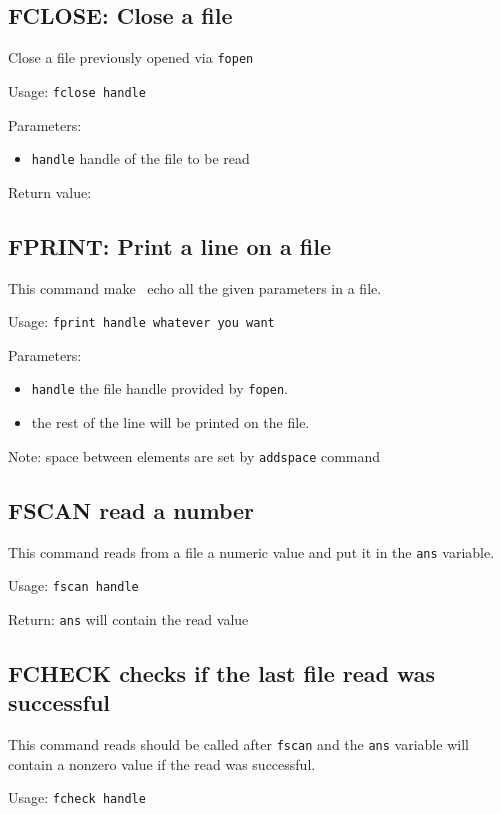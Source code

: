 \subsection{FCLOSE: Close a file}
    Close a file previously opened via \lstinline!fopen!

    Usage: \lstinline!fclose handle!

    Parameters:
    \begin{itemize}
    \item\lstinline!handle! handle of the file to be read
    \end{itemize}
    
    Return value: 
    
\subsection{FPRINT: Print a line on a file}
    This command make \afmm\ echo all the given parameters in a file.
    
    Usage: \lstinline!fprint handle whatever you want!
    
    Parameters:
    \begin{itemize}
    \item\lstinline!handle! the file handle provided by \lstinline!fopen!.
    \item the rest of the line will be printed on the file.
    \end{itemize}
    
    Note: space between elements are set by \lstinline!addspace! command
\subsection{FSCAN read a number}
    This command reads from a file a numeric value and put it in the \lstinline!ans! variable.

    Usage: \lstinline!fscan handle!
    
    Return:
    \lstinline!ans! will contain the read value

\subsection{FCHECK checks if the last file read was successful}
    This command reads should be called after \lstinline!fscan! and the  \lstinline!ans! variable will contain a nonzero value if the read was successful.

    Usage: \lstinline!fcheck handle!
    
